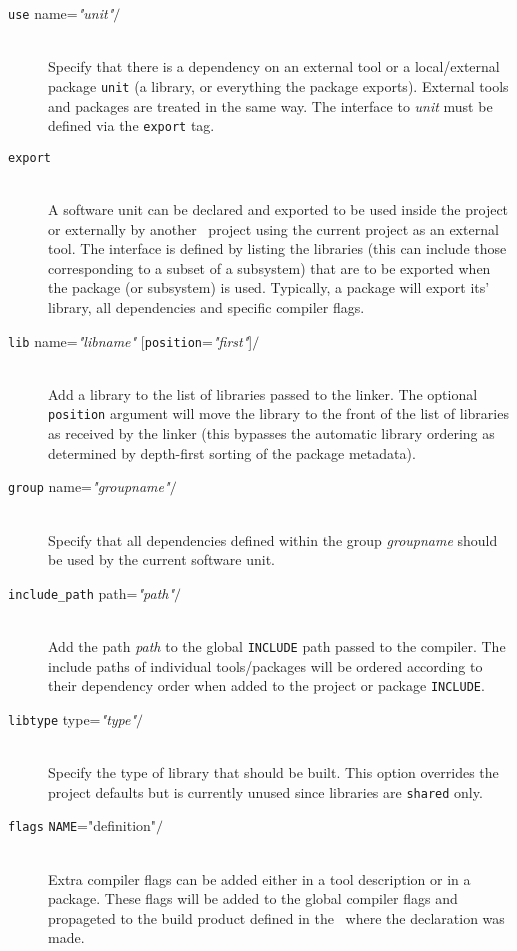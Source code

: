 \begin{description}

\item[\lbkt\texttt{use} name=\textit{"unit"}$/$\rbkt]\mbox{}\\
  Specify that there is a dependency on an external tool or a
  local/external package \texttt{unit} (\eg a library, or everything the package
  exports). External tools and packages are treated in the same way.
  The interface to \textit{unit} must be defined via the
  \lbkt\texttt{export}\rbkt{} tag.

\item[\lbkt\texttt{export}\rbkt{}]\mbox{}\\
  A software unit can be declared and exported to be used inside the
  project or externally by another \scram\ project using the current
  project as an external tool. The interface is defined by listing
  the libraries (this can include those corresponding to a subset of a
  subsystem) that are to be exported when the package (or subsystem)
  is used. Typically, a package will export its' library, all 
  dependencies and specific compiler flags.

\item[\lbkt\texttt{lib} name=\textit{"libname"} {[}\texttt{position}=\textit{"first"}{]}$/$\rbkt]\mbox{}\\
  Add a library to the list of libraries passed to the linker. The
  optional \texttt{position} argument will move the library to the
  front of the list of libraries as received by the linker (this
  bypasses the automatic library ordering as determined by depth-first
  sorting of the package metadata).
  
\item[\lbkt\texttt{group} name=\textit{"groupname"}$/$\rbkt]\mbox{}\\
  Specify that all dependencies defined within the group
  \textit{groupname} should be used by the current software unit.

\item[\lbkt\texttt{include\_path} path=\textit{"path"}$/$\rbkt]\mbox{}\\
  Add the path \textit{path} to the global \texttt{INCLUDE} path
  passed to the compiler. The include paths of individual
  tools/packages will be ordered according to their dependency order
  when added to the project or package \texttt{INCLUDE}.

\item[\lbkt\texttt{libtype} type=\textit{"type"}$/$\rbkt]\mbox{}\\
  Specify the type of library that should be built. 
  This option overrides the project defaults but is currently unused
  since libraries are \texttt{shared} only.

\item[\lbkt\texttt{flags} \texttt{NAME}="definition"$/$\rbkt]\mbox{}\\
  Extra compiler flags can be added either in a tool description or in
  a package. These flags will be added to the global compiler flags
  and propageted to the build product defined in the \buildfile\ where
  the declaration was made.
\end{description}


